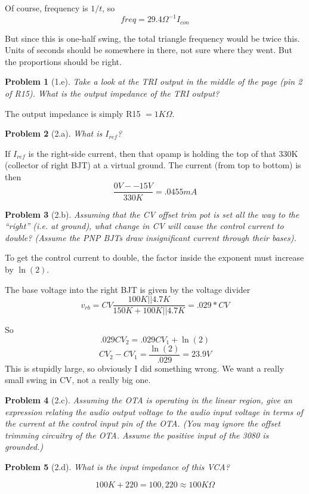 \documentclass[12pt]{article}
\providecommand{\ohm}[0]{\ensuremath{\Omega}}
\newtheorem*{prob}{Problem}
\begin{document}
Of course, frequency is $1/t$, so
\[ freq = 29.4 \ohm^{-1} I_{con} \]

But since this is one-half swing, the total triangle frequency would be twice this.
Units of seconds should be somewhere in there, not sure where they went. But the proportions should be right.

\begin{prob}[1.e]{
Take a look at the TRI output in the middle of the page (pin 2 of R15). What is the output impedance of the TRI output?
}\end{prob}
The output impedance is simply R15 $= 1K\ohm$.

\begin{prob}[2.a]{
What is $I_{ref}$?
}\end{prob}
If $I_{ref}$ is the right-side current, then that opamp is holding the top of that 330K (collector of right BJT) at a virtual ground. The current (from top to bottom) is then
\[ \frac{0V--15V}{330K} = .0455 mA \]

\begin{prob}[2.b]{
 Assuming that the CV offset trim pot is set all the way to the ``right'' (i.e. at ground), what change in CV will cause the control current to double? (Assume the PNP BJTs draw insignificant current through their bases).
}\end{prob}
To get the control current to double, the factor inside the exponent must increase by $\ln(2)$.

The base voltage into the right BJT is given by the voltage divider
\[ v_{rb} = CV\frac{100K||4.7K}{150K+100K||4.7K} = .029*CV \]

So
\[.029CV_2 = .029CV_1 + \ln(2) \]
\[CV_2-CV_1 = \frac{\ln(2)}{.029} = 23.9 V\]
This is stupidly large, so obviously I did something wrong. We want a really small swing in CV, not a really big one.

\begin{prob}[2.c]{
 Assuming the OTA is operating in the linear region, give an expression relating the audio output voltage to the audio input voltage in terms of the current at the control input pin of the OTA. (You may ignore the offset trimming circuitry of the OTA. Assume the positive input of the 3080 is grounded.)
}\end{prob}


\begin{prob}[2.d]{
What is the input impedance of this VCA?
}\end{prob}
\[ 100K + 220 = 100,220 \approx 100K\ohm\]
\end{document}
